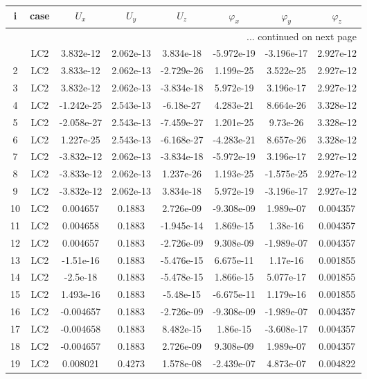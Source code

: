 \documentclass{article}%
\begin{document}
\begin{longtable}{| c c | c c c c c c |}%
\hline%
i&case&$U_x$&$U_y$&$U_z$&$\varphi_x$&$\varphi_y$&$\varphi_z$\\%
\hline%
\endhead%
\hline%
\multicolumn{8}{r}{... continued on next page}\\%
\endfoot%
\hline%
\endlastfoot%
1&LC2&3.832e{-}12&2.062e{-}13&3.834e{-}18&{-}5.972e{-}19&{-}3.196e{-}17&2.927e{-}12\\%
2&LC2&3.833e{-}12&2.062e{-}13&{-}2.729e{-}26&1.199e{-}25&3.522e{-}25&2.927e{-}12\\%
3&LC2&3.832e{-}12&2.062e{-}13&{-}3.834e{-}18&5.972e{-}19&3.196e{-}17&2.927e{-}12\\%
4&LC2&{-}1.242e{-}25&2.543e{-}13&{-}6.18e{-}27&4.283e{-}21&8.664e{-}26&3.328e{-}12\\%
5&LC2&{-}2.058e{-}27&2.543e{-}13&{-}7.459e{-}27&1.201e{-}25&9.73e{-}26&3.328e{-}12\\%
6&LC2&1.227e{-}25&2.543e{-}13&{-}6.168e{-}27&{-}4.283e{-}21&8.657e{-}26&3.328e{-}12\\%
7&LC2&{-}3.832e{-}12&2.062e{-}13&{-}3.834e{-}18&{-}5.972e{-}19&3.196e{-}17&2.927e{-}12\\%
8&LC2&{-}3.833e{-}12&2.062e{-}13&1.237e{-}26&1.193e{-}25&{-}1.575e{-}25&2.927e{-}12\\%
9&LC2&{-}3.832e{-}12&2.062e{-}13&3.834e{-}18&5.972e{-}19&{-}3.196e{-}17&2.927e{-}12\\%
10&LC2&0.004657&0.1883&2.726e{-}09&{-}9.308e{-}09&1.989e{-}07&0.004357\\%
11&LC2&0.004658&0.1883&{-}1.945e{-}14&1.869e{-}15&1.38e{-}16&0.004357\\%
12&LC2&0.004657&0.1883&{-}2.726e{-}09&9.308e{-}09&{-}1.989e{-}07&0.004357\\%
13&LC2&{-}1.51e{-}16&0.1883&{-}5.476e{-}15&6.675e{-}11&1.17e{-}16&0.001855\\%
14&LC2&{-}2.5e{-}18&0.1883&{-}5.478e{-}15&1.866e{-}15&5.077e{-}17&0.001855\\%
15&LC2&1.493e{-}16&0.1883&{-}5.48e{-}15&{-}6.675e{-}11&1.179e{-}16&0.001855\\%
16&LC2&{-}0.004657&0.1883&{-}2.726e{-}09&{-}9.308e{-}09&{-}1.989e{-}07&0.004357\\%
17&LC2&{-}0.004658&0.1883&8.482e{-}15&1.86e{-}15&{-}3.608e{-}17&0.004357\\%
18&LC2&{-}0.004657&0.1883&2.726e{-}09&9.308e{-}09&1.989e{-}07&0.004357\\%
19&LC2&0.008021&0.4273&1.578e{-}08&{-}2.439e{-}07&4.873e{-}07&0.004822\\%

\end{longtable}
\end{document}
